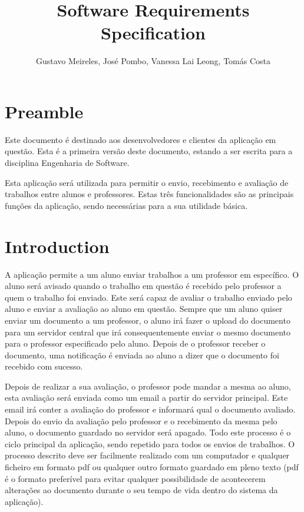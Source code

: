\documentclass[10pt]{article}
\author{Gustavo Meireles, José Pombo, Vanessa Lai Leong, Tomás Costa}
\title{Software Requirements Specification}
\begin{document}
\maketitle

\section{Preamble}
Este documento é destinado aos desenvolvedores e clientes da aplicação 
em questão. Esta é a primeira versão deste documento, estando a ser 
escrita para a disciplina Engenharia de Software. 

Esta aplicação será utilizada para permitir o envio, recebimento e 
avaliação de trabalhos entre alunos e professores. 
Estas três funcionalidades são as principais funções da aplicação, 
sendo necessárias para a sua utilidade básica.

\section{Introduction}
A aplicação permite a um aluno enviar trabalhos a um professor 
em específico. O aluno será avisado quando o trabalho em questão 
é recebido pelo professor a quem o trabalho foi enviado. 
Este será capaz de avaliar o trabalho enviado pelo aluno e 
enviar a avaliação ao aluno em questão. Sempre que um aluno 
quiser enviar um documento a um professor, o aluno irá fazer o 
upload do documento para um servidor central que irá consequentemente 
enviar o mesmo documento para o professor especificado pelo aluno. 
Depois de o professor receber o documento, uma notificação é enviada ao 
aluno a dizer que o documento foi recebido com sucesso. 

Depois de realizar a sua avaliação, o professor pode mandar a mesma 
ao aluno, esta avaliação será enviada como um email a partir do 
servidor principal. Este email irá conter a avaliação do professor e 
informará qual o documento avaliado. Depois do envio da avaliação pelo 
professor e o recebimento da mesma pelo aluno, o documento 
guardado no servidor será apagado. Todo este processo é o ciclo 
principal da aplicação, sendo repetido para todos os envios de trabalhos. 
O processo descrito deve ser facilmente realizado com um 
computador e qualquer ficheiro em formato pdf ou qualquer outro
formato guardado em pleno texto (pdf é o formato 
preferível para evitar qualquer possibilidade de acontecerem 
alterações ao documento durante o seu tempo de vida dentro 
do sistema da aplicação).
\end{document}
